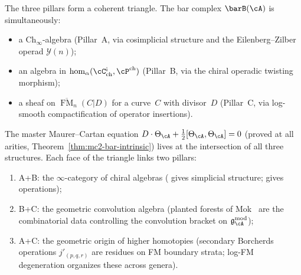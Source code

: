 \begin{remark}
\label{rem:three-pillar-triangle}
The three pillars form a coherent triangle.  The bar complex
$\barB(\cA)$ is simultaneously:
\begin{itemize}
\item a $\mathrm{Ch}_\infty$-algebra (Pillar~A, via cosimplicial structure
  and the Eilenberg--Zilber operad $\mathcal{Y}(n)$);
\item an algebra in
  $\operatorname{hom}_\alpha(\cC^{\textup{!`}}_{\mathrm{ch}},
  \cP^{\mathrm{ch}})$ (Pillar~B, via the chiral operadic twisting
  morphism);
\item a sheaf on $\overline{\operatorname{FM}}_n(C|D)$ for a curve~$C$
  with divisor~$D$ (Pillar~C, via log-smooth compactification of
  operator insertions).
\end{itemize}
The master Maurer--Cartan equation
$D \cdot \Theta_\cA + \tfrac{1}{2}[\Theta_\cA, \Theta_\cA] = 0$
(proved at all arities, Theorem~\ref{thm:mc2-bar-intrinsic})
lives at the intersection of all three structures.  Each face of the
triangle links two pillars:
\begin{enumerate}[label=\textup{(\roman*)}]
\item A+B: the $\infty$-category of chiral algebras
  (\cite[Theorem~3.8]{Val16} gives simplicial structure; \cite{MS24}
  gives operations);
\item B+C: the geometric convolution algebra (planted forests of
  Mok~\cite{Mok25} are the combinatorial data controlling the
  convolution bracket on $\mathfrak{g}_\cA^{\mathrm{mod}}$);
\item A+C: the geometric origin of higher homotopies (secondary Borcherds
  operations $j'_{(p,q,r)}$ are residues on FM boundary strata; log-FM
  degeneration organizes these across genera).
\end{enumerate}
\end{remark}


